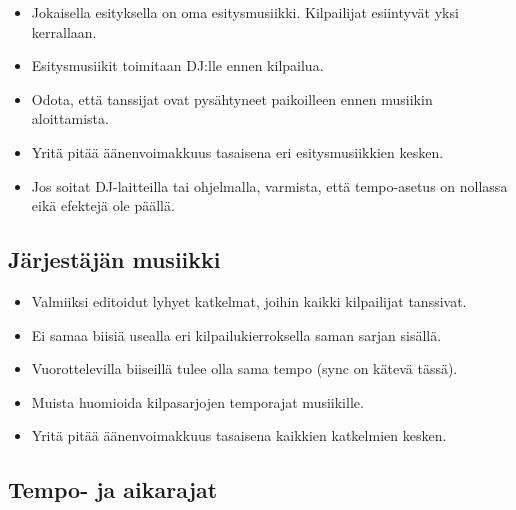 \documentclass[12pt, a4paper, oneside]{article}
\begin{document}
\begin{itemize}[itemsep=-2pt]
    \item Jokaisella esityksella on oma esitysmusiikki. Kilpailijat esiintyvät yksi kerrallaan.
    \item Esitysmusiikit toimitaan DJ:lle ennen kilpailua.
    \item Odota, että tanssijat ovat pysähtyneet paikoilleen ennen musiikin aloittamista.
    \item Yritä pitää äänenvoimakkuus tasaisena eri esitysmusiikkien kesken.
    \item Jos soitat DJ-laitteilla tai ohjelmalla, varmista, että tempo-asetus on nollassa eikä efektejä ole päällä.
\end{itemize}

\subsection{Järjestäjän musiikki}

\begin{itemize}[itemsep=-2pt]
    \item Valmiiksi editoidut lyhyet katkelmat, joihin kaikki kilpailijat tanssivat.
    \item Ei samaa biisiä usealla eri kilpailukierroksella saman sarjan sisällä.
    \item Vuorottelevilla biiseillä tulee olla sama tempo (sync on kätevä tässä).
    \item Muista huomioida kilpasarjojen temporajat musiikille.
    \item Yritä pitää äänenvoimakkuus tasaisena kaikkien katkelmien kesken.
\end{itemize}

\subsection{Tempo- ja aikarajat} \label{rajat}
\end{document}
